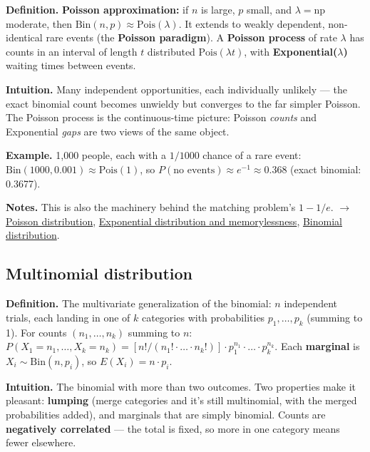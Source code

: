 \documentclass[11pt,a4paper]{article}
\begin{document}
\textbf{Definition.} \textbf{Poisson approximation:} if $n$ is large, $p$ small, and $\lambda  = \text{np}$ moderate, then $\mathrm{Bin}(n, p) \approx  \mathrm{Pois}(\lambda )$. It extends to weakly dependent, non-identical rare events (the \textbf{Poisson paradigm}). A \textbf{Poisson process} of rate $\lambda$ has counts in an interval of length $t$ distributed $\mathrm{Pois}(\lambda t)$, with \textbf{Exponential($\lambda$)} waiting times between events.

\textbf{Intuition.} Many independent opportunities, each individually unlikely --- the exact binomial count becomes unwieldy but converges to the far simpler Poisson. The Poisson process is the continuous-time picture: Poisson \textit{counts} and Exponential \textit{gaps} are two views of the same object.

\textbf{Example.} 1,000 people, each with a $1/1000$ chance of a rare event: $\mathrm{Bin}(1000, 0.001) \approx  \mathrm{Pois}(1)$, so $P(\text{no events}) \approx  e^{-1} \approx  0.368$ (exact binomial: 0.3677).

\textbf{Notes.} This is also the machinery behind the matching problem's $1 - 1/e$. $\to$ \hyperref[sec:poisson-distribution]{Poisson distribution}, \hyperref[sec:exponential-distribution-and-memorylessness]{Exponential distribution and memorylessness}, \hyperref[sec:binomial-distribution]{Binomial distribution}.

\subsection{Multinomial distribution}\label{sec:multinomial-distribution}

\textbf{Definition.} The multivariate generalization of the binomial: $n$ independent trials, each landing in one of $k$ categories with probabilities $p_{1}, \ldots , p_k$ (summing to 1). For counts $(n_{1}, \ldots , n_k)$ summing to $n$:
$P(X_{1} = n_{1}, \ldots , X_k = n_k) = [n! / (n_{1}!\cdot \ldots \cdot n_k!)]\cdot p_{1}^{n_{1}}\cdot \ldots \cdot p_k^{n_k}$.
Each \textbf{marginal} is $X_{i} \sim \mathrm{Bin}(n, p_{i})$, so $E(X_{i}) = n\cdot p_{i}$.

\textbf{Intuition.} The binomial with more than two outcomes. Two properties make it pleasant: \textbf{lumping} (merge categories and it's still multinomial, with the merged probabilities added), and marginals that are simply binomial. Counts are \textbf{negatively correlated} --- the total is fixed, so more in one category means fewer elsewhere.
\end{document}
